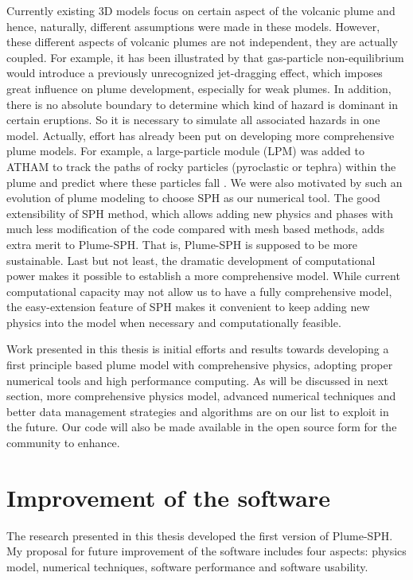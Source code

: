 Currently existing 3D models focus on certain aspect of the volcanic plume and hence, naturally, different assumptions were made in these models. However, these different aspects of volcanic plumes are not independent, they are actually coupled. For example, it has been illustrated by \citet{cerminara2016large} that gas-particle non-equilibrium would introduce a previously unrecognized jet-dragging effect, which imposes great influence on plume development, especially for weak plumes. In addition, there is no absolute boundary to determine which kind of hazard is dominant in certain eruptions. So it is necessary to simulate all associated hazards in one model. Actually, effort has already been put on developing more comprehensive plume models. For example, a large-particle module (LPM) was added to ATHAM to track the paths of rocky particles (pyroclastic or tephra) within the plume and predict where these particles fall \citep{kobs2009modeling}. We were also motivated by such an evolution of plume modeling to choose SPH as our numerical tool. The good extensibility of SPH method, which allows adding new physics and phases with much less modification of the code compared with mesh based methods, adds extra merit to Plume-SPH. That is, Plume-SPH is supposed to be more sustainable.
Last but not least, the dramatic development of computational power makes it possible to establish a more comprehensive model. While current computational capacity may not allow us to have a fully comprehensive model, the easy-extension feature of SPH makes it convenient to keep adding new physics into the model when necessary and computationally feasible. 

Work presented in this thesis is initial efforts and results towards developing a first principle based plume model with comprehensive physics, adopting proper numerical tools and high performance computing. As will be discussed in next section, more comprehensive physics model, advanced numerical techniques and better data management strategies and algorithms are on our list to exploit in the future. Our code will also be made available in the open source form for the community to enhance.

\section{Improvement of the software}
The research presented in this thesis developed the first version of Plume-SPH.
My proposal for future improvement of the software includes four aspects: physics model, numerical techniques, software performance and software usability.

